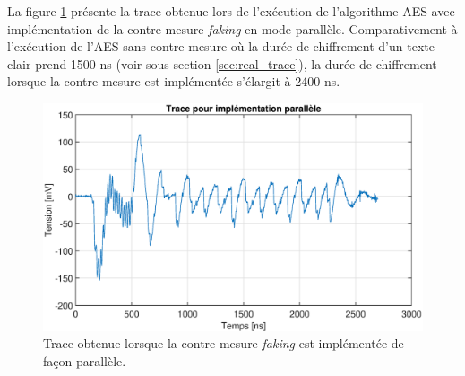 \documentclass[oneside]{book}
\begin{document}
La figure \ref{fig:real_trace_faking_parallele} présente la trace obtenue lors de l'exécution de l'algorithme AES avec implémentation de la contre-mesure \textit{faking} en mode parallèle. Comparativement à l'exécution de l'AES sans contre-mesure où la durée de chiffrement d'un texte clair prend 1500 \si{\nano\second} (voir sous-section \ref{sec:real_trace}), la durée de chiffrement lorsque la contre-mesure est implémentée s'élargit à 2400 \si{\nano\second}.

\begin{figure}[htbp]
    \hspace{-1cm}
    \includegraphics[scale=0.54]{image/real_trace_faking_parallele}
    \caption{Trace obtenue lorsque la contre-mesure \textit{faking} est implémentée de façon parallèle.}
    \label{fig:real_trace_faking_parallele} 
\end{figure}
\end{document}
